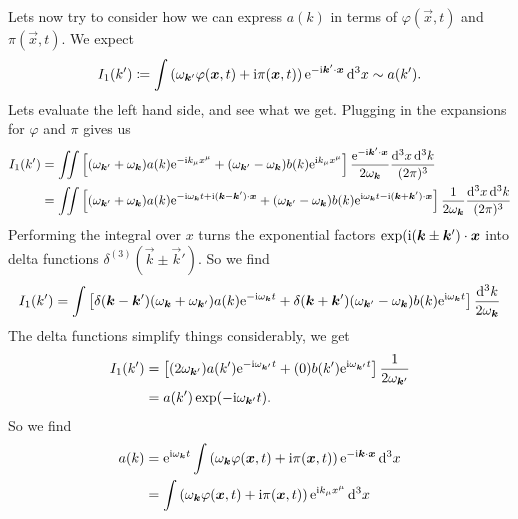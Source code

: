 Lets now try to consider how we can express $a(k)$ in terms of
$\varphi(\vec{x},t)$ and $\pi(\vec{x},t)$. We expect
\begin{equation}
I_{1}(k')\eqDef\int\left(\omega_{\vec{k}'}\varphi(\vec{x},t)+\I\pi(\vec{x},t)\right)\E^{-\I\vec{k}'\cdot\vec{x}}\,\D^{3}x\looksLike a(k').
\end{equation}
Lets evaluate the left hand side, and see what we get. Plugging in the
expansions for $\varphi$ and $\pi$ gives us
\begin{equation}
\begin{split}
I_{1}(k')&=\iint\left[
(\omega_{\vec{k}'}+\omega_{\vec{k}})a(k)\E^{-\I k_{\mu}x^{\mu}}
+(\omega_{\vec{k}'}-\omega_{\vec{k}})b(k)\E^{\I k_{\mu}x^{\mu}}
\right]\frac{\E^{-\I\vec{k}'\cdot\vec{x}}}{2\omega_{\vec{k}}}\frac{\D^{3}x\,\D^{3}k}{(2\pi)^{3}}\\
&=\iint\left[
(\omega_{\vec{k}'}+\omega_{\vec{k}})a(k)\E^{-\I \omega_{\vec{k}}t +\I(\vec{k}-\vec{k}')\cdot\vec{x}}
+(\omega_{\vec{k}'}-\omega_{\vec{k}})b(k)\E^{\I \omega_{\vec{k}}t - \I(\vec{k}+\vec{k}')\cdot\vec{x}}
\right]\frac{1}{2\omega_{\vec{k}}}\frac{\D^{3}x\,\D^{3}k}{(2\pi)^{3}}
\end{split}
\end{equation}
Performing the integral over $x$ turns the exponential factors
$\exp(\I(\vec{k}\pm\vec{k}')\cdot\vec{x}$ into delta functions
$\delta^{(3)}(\vec{k}\pm\vec{k}')$. So we find
\begin{equation}
I_{1}(k')=\int\left[
\delta(\vec{k}-\vec{k}')(\omega_{\vec{k}}+\omega_{\vec{k}'})a(k)\E^{-\I\omega_{\vec{k}}t}
+\delta(\vec{k}+\vec{k}')(\omega_{\vec{k}'}-\omega_{\vec{k}})b(k)\E^{\I \omega_{\vec{k}}t}
\right]\frac{\D^{3}k}{2\omega_{\vec{k}}}
\end{equation}
The delta functions simplify things considerably, we get
\begin{equation}
\begin{split}
I_{1}(k')&=\left[
(2\omega_{\vec{k}'})a(k')\E^{-\I\omega_{\vec{k}'}t}
+(0)b(k')\E^{\I \omega_{\vec{k}'}t}
\right]\frac{1}{2\omega_{\vec{k}'}}\\
&=a(k')\exp(-\I\omega_{\vec{k}'}t).
\end{split}
\end{equation}
So we find
\begin{equation}\label{eq:scalar:ladder-operator-in-terms-of-field-vars}
\begin{split}
a(k) &= \E^{\I\omega_{\vec{k}}t}\int\left(\omega_{\vec{k}}\varphi(\vec{x},t)+\I\pi(\vec{x},t)\right)\E^{-\I\vec{k}\cdot\vec{x}}\,\D^{3}x\\
&=\int\left(\omega_{\vec{k}}\varphi(\vec{x},t)+\I\pi(\vec{x},t)\right)\E^{\I k_{\mu}x^{\mu}}\,\D^{3}x
\end{split}
\end{equation}

